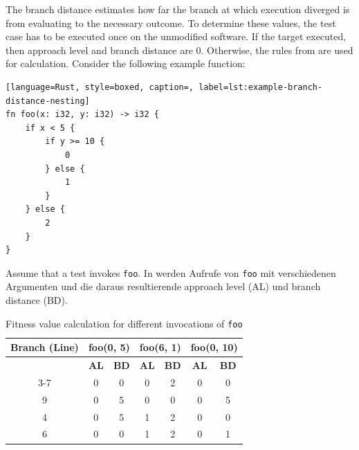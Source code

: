 \documentclass{article}
\begin{document}
The branch distance estimates how far the branch at which execution diverged is from evaluating to the necessary outcome. To determine these values, the test case has to be executed once on the unmodified software. If the target executed, then approach level and branch distance are 0. Otherwise, the rules from  are used for calculation. Consider the following example function:

\begin{lstlisting}[language=Rust, style=boxed, caption=, label=lst:example-branch-distance-nesting]
fn foo(x: i32, y: i32) -> i32 {
    if x < 5 {
        if y >= 10 {
            0
        } else {
            1
        }
    } else {
        2
    }
}
\end{lstlisting}

Assume that a test invokes \lstinline{foo}. In  werden Aufrufe von \lstinline{foo} mit verschiedenen Argumenten und die daraus resultierende approach level (AL) und branch distance (BD).
\begin{table}[h!]
\centering
\begin{tabular}{c|cc|cc|cc}
\hline
\textbf{Branch (Line)} & \multicolumn{2}{c|}{\textbf{foo(0, 5)}}                     & \multicolumn{2}{c|}{\textbf{foo(6, 1)}}                      & \multicolumn{2}{c}{\textbf{foo(0, 10)}}                     \\
                       \hline
 & \textbf{AL} & \textbf{BD} & \textbf{AL} & \textbf{BD} & \textbf{AL} & \textbf{BD} \\
3-7                    & 0                       & 0                        & 0                       & 2                        & 0                       & 0                        \\
9                      & 0                       & 5                        & 0                       & 0                        & 0                       & 5                        \\
4                      & 0                       & 5                        & 1                       & 2                        & 0                       & 0                        \\
6                      & 0                       & 0                        & 1                       & 2                        & 0                       & 1 \\ \hline
\end{tabular}
\caption{Fitness value calculation for different invocations of \lstinline{foo}}
\label{tab:example-fitness-calculation}
\end{table}
\end{document}
